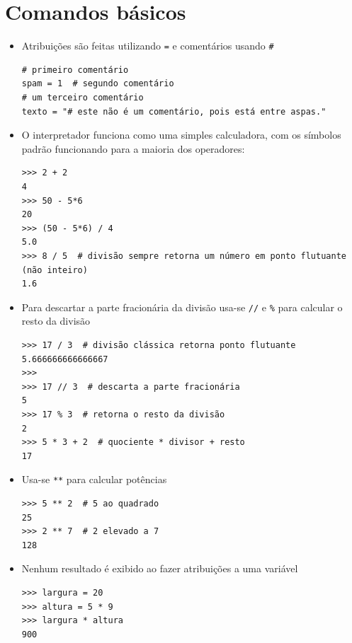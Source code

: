 \section{Comandos básicos}
\begin{itemize}
	\item Atribuições são feitas utilizando \verb|=| e comentários usando \verb|#|
	\begin{verbatim}
# primeiro comentário
spam = 1  # segundo comentário
# um terceiro comentário
texto = "# este não é um comentário, pois está entre aspas."
	\end{verbatim}
	\item O interpretador funciona como uma simples calculadora, com os símbolos padrão funcionando para a maioria dos operadores:
	\begin{verbatim}
>>> 2 + 2
4
>>> 50 - 5*6
20
>>> (50 - 5*6) / 4
5.0
>>> 8 / 5  # divisão sempre retorna um número em ponto flutuante (não inteiro)
1.6
	\end{verbatim}
	\item Para descartar a parte fracionária da divisão usa-se \verb|//| e \verb|%| para calcular o resto da divisão
	\begin{verbatim}
>>> 17 / 3  # divisão clássica retorna ponto flutuante
5.666666666666667
>>>
>>> 17 // 3  # descarta a parte fracionária
5
>>> 17 % 3  # retorna o resto da divisão
2
>>> 5 * 3 + 2  # quociente * divisor + resto
17
	\end{verbatim}
	\item Usa-se \verb|**| para calcular potências
	\begin{verbatim}
>>> 5 ** 2  # 5 ao quadrado
25
>>> 2 ** 7  # 2 elevado a 7
128
	\end{verbatim}
	\item Nenhum resultado é exibido ao fazer atribuições a uma variável
	\begin{verbatim}
>>> largura = 20
>>> altura = 5 * 9
>>> largura * altura
900
	\end{verbatim}
\end{itemize}

